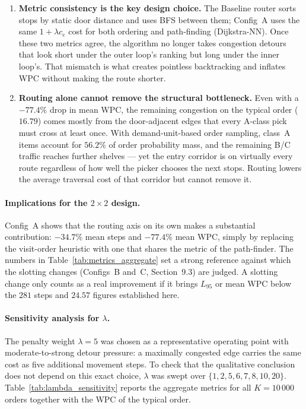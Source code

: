 \documentclass[12pt,a4paper]{article}
\begin{document}
\begin{enumerate}
  \item \textbf{Metric consistency is the key design choice.}
        The Baseline router sorts stops by static door distance and uses
        BFS between them; Config~A uses the same $1 + \lambda c_e$ cost
        for both ordering and path-finding (Dijkstra-NN).
        Once these two metrics agree, the algorithm no longer takes
        congestion detours that look short under the outer loop's
        ranking but long under the inner loop's. That mismatch is what
        creates pointless backtracking and inflates WPC without making
        the route shorter.

  \item \textbf{Routing alone cannot remove the structural bottleneck.}
        Even with a $-77.4\%$ drop in mean WPC, the remaining congestion on the
        typical order ($16.79$) comes mostly from the door-adjacent
        edges that every A-class pick must cross at least once.
        With demand-unit-based order sampling, class~A items account
        for $56.2\%$ of order probability mass, and the remaining B/C
        traffic reaches further shelves --- yet the entry corridor
        is on virtually every route regardless of how well the picker
        chooses the next stops.
        Routing lowers the average traversal cost of that corridor but
        cannot remove it.
\end{enumerate}

\paragraph{Implications for the $2 \times 2$ design.}
Config~A shows that the routing axis on its own makes a substantial
contribution: $-34.7\%$ mean steps and $-77.4\%$ mean WPC, simply by
replacing the visit-order heuristic with one that shares the metric of
the path-finder.
The numbers in Table~\ref{tab:metrics_aggregate} set a strong reference
against which the slotting changes (Configs~B and~C, Section~9.3) are
judged.
A slotting change only counts as a real improvement if it brings
$L_{95}$ or mean WPC below the $281$ steps and $24.57$ figures
established here.

\paragraph{Sensitivity analysis for $\lambda$.}
The penalty weight $\lambda = 5$ was chosen as a representative operating
point with moderate-to-strong detour pressure: a maximally congested
edge carries the same cost as five additional movement steps.
To check that the qualitative conclusion does not depend on this exact
choice, $\lambda$ was swept over $\{1, 2, 5, 6, 7, 8, 10, 20\}$.
Table~\ref{tab:lambda_sensitivity} reports the aggregate metrics for all
$K = 10\,000$ orders together with the WPC of the typical order.
\end{document}
